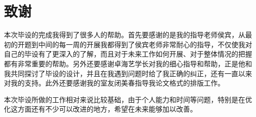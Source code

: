 \chapter*{致\qquad 谢}
\songti{}

  本次毕设的完成我得到了很多人的帮助。首先要感谢的是我的指导老师侯宾，从最初的开题到中间的每一周的开展我都得到了侯宾老师非常耐心的指导，不仅使我对自己的毕设有了更深入的了解，而且对于未来工作如何开展、对于整体情况的把握都有非常重要的帮助。另外还要感谢卓海艺学长对我的细心指导和帮助，正是他和我共同探讨了毕设的设计，并且在我遇到问题时给了我正确的纠正，还有一直以来对我的支持。此外还要感谢我的室友闭美春指导我论文格式的排版工作。

  本次毕设所做的工作相对来说比较基础，由于个人能力和时间等问题，特别是在优化这方面还有不少可以改进的地方，希望在未来能够加以改善。